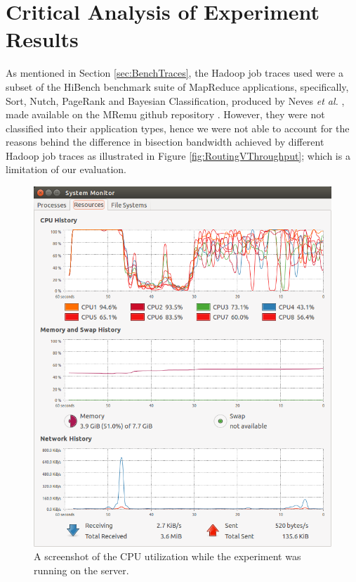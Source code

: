 \section{Critical Analysis of Experiment Results} \label{sec:CriticalAnalysisEval}
As mentioned in Section \ref{sec:BenchTraces}, the Hadoop job traces used were a subset of the HiBench benchmark suite of MapReduce applications, specifically, Sort, Nutch, PageRank and Bayesian Classification, produced by Neves \textit{et al.} \cite{neves2015mremu}, made available on the MRemu github repository \cite{MRemuRepo2015}. However, they were not classified into their application types, hence we were not able to account for the reasons behind the difference in bisection bandwidth achieved by different Hadoop job traces as illustrated in Figure \ref{fig:RoutingVThroughput}; which is a limitation of our evaluation.  
\begin{figure}[!ht]
	\centerline{\includegraphics[scale=0.35]{graphics/chapter6/CPUUtilization.png}}
	\caption{A screenshot of the CPU utilization while the experiment was running on the server.}
	\label{fig:CPUutilization}
\end{figure}

